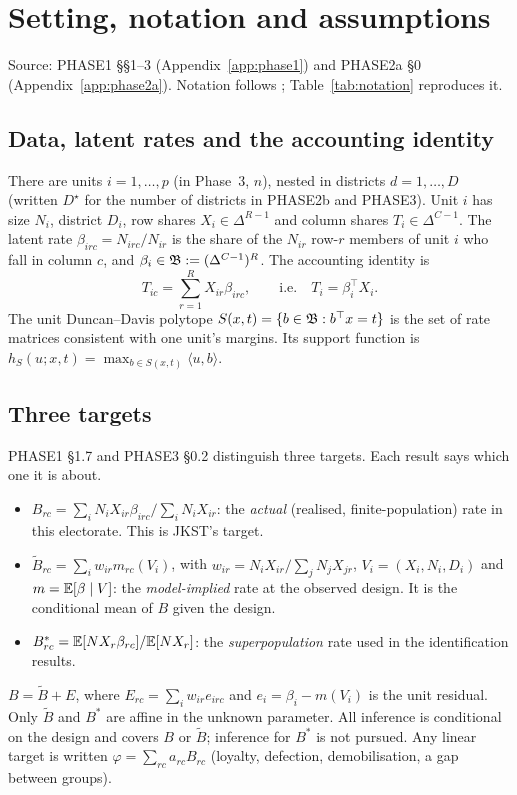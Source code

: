 \section{Setting, notation and assumptions}\label{sec:setting}

Source: PHASE1 \S\S1--3 (Appendix~\ref{app:phase1}) and PHASE2a \S0
(Appendix~\ref{app:phase2a}). Notation follows
; Table~\ref{tab:notation} reproduces it.

\subsection{Data, latent rates and the accounting identity}

There are units $i=1,\dots,p$ (in Phase~3, $n$), nested in districts
$d=1,\dots,D$ (written $D^\star$ for the number of districts in PHASE2b and
PHASE3). Unit $i$ has size $N_i$, district $D_i$, row shares
$X_i\in\Delta^{R-1}$ and column shares $T_i\in\Delta^{C-1}$. The latent rate
$\beta_{irc}=N_{irc}/N_{ir}$ is the share of the $N_{ir}$ row-$r$ members of
unit $i$ who fall in column $c$, and $\beta_i\in\mathfrak B:=(\Delta^{C-1})^R$. The
accounting identity is
\begin{equation}\label{eq:acc}
T_{ic}=\sum_{r=1}^RX_{ir}\beta_{irc},\qquad\text{i.e.}\quad T_i=\beta_i^\top X_i .
\end{equation}
The unit Duncan--Davis polytope $S(x,t)=\{b\in\mathfrak B:b^\top x=t\}$ is the set of
rate matrices consistent with one unit's margins. Its support function is
$h_S(u;x,t)=\max_{b\in S(x,t)}\langle u,b\rangle$.

\subsection{Three targets}

PHASE1 \S1.7 and PHASE3 \S0.2 distinguish three targets. Each result says which
one it is about.
\begin{itemize}[nosep]
\item $B_{rc}=\sum_iN_iX_{ir}\beta_{irc}/\sum_iN_iX_{ir}$: the \emph{actual}
(realised, finite-population) rate in this electorate. This is JKST's target.
\item $\tilde B_{rc}=\sum_iw_{ir}m_{rc}(V_i)$, with $w_{ir}=N_iX_{ir}/\sum_jN_jX_{jr}$,
$V_i=(X_i,N_i,D_i)$ and $m=\mathbb E[\beta\mid V]$: the \emph{model-implied} rate at
the observed design. It is the conditional mean of $B$ given the design.
\item $B^*_{rc}=\mathbb E[NX_r\beta_{rc}]/\mathbb E[NX_r]$: the \emph{superpopulation} rate
used in the identification results.
\end{itemize}
$B=\tilde B+E$, where $E_{rc}=\sum_iw_{ir}e_{irc}$ and $e_i=\beta_i-m(V_i)$ is
the unit residual. Only $\tilde B$ and $B^*$ are affine in the unknown
parameter. All inference is conditional on the design and covers $B$ or
$\tilde B$; inference for $B^*$ is not pursued. Any linear target is written
$\varphi=\sum_{rc}a_{rc}B_{rc}$ (loyalty, defection, demobilisation, a gap
between groups).

